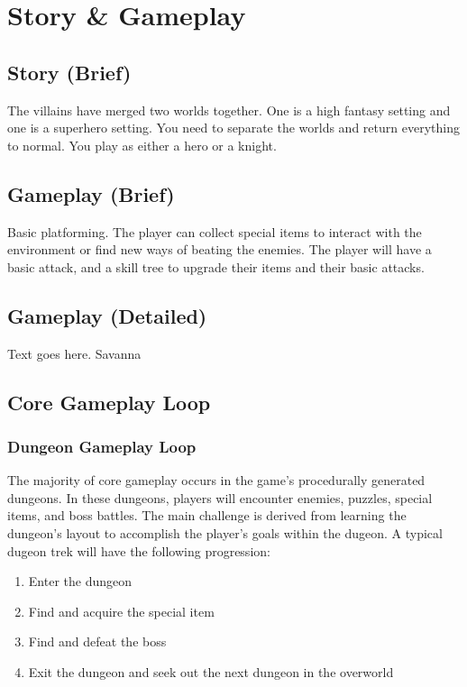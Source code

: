 \documentclass[titlepage]{article}
\begin{document}
\section{Story \& Gameplay}
\subsection*{Story (Brief)}
The villains have merged two worlds together. One is a high fantasy setting and
one is a superhero setting. You need to separate the worlds and return
everything to normal. You play as either a hero or a knight. 

\subsection*{Gameplay (Brief)}
Basic platforming. The player can collect special items to interact with the
environment or find new ways of beating the enemies. The player will have a
basic attack, and a skill tree to upgrade their items and their basic attacks.  

\subsection*{Gameplay (Detailed)}
Text goes here. Savanna

\subsection*{Core Gameplay Loop}

\subsubsection*{Dungeon Gameplay Loop}
The majority of core gameplay occurs in the game's procedurally generated
dungeons. In these dungeons, players will encounter enemies, puzzles, special
items, and boss battles. The main challenge is derived from learning the
dungeon's layout to accomplish the player's goals within the dugeon. A typical
dugeon trek will have the following progression:

\begin{enumerate}
    \item Enter the dungeon
    \item Find and acquire the special item
    \item Find and defeat the boss
    \item Exit the dungeon and seek out the next dungeon in the overworld
\end{enumerate}
\end{document}
